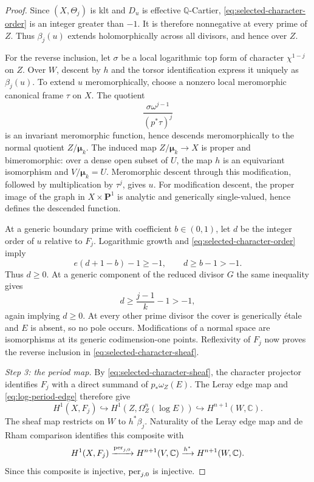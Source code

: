 \documentclass[11pt,a4paper]{article}
\numberwithin{equation}{section}
\theoremstyle{definition}
\theoremstyle{remark}
\newcommand{\Q}{\mathbb Q}\newcommand{\R}{\mathbb R}
\newcommand{\C}{\mathbb C}\newcommand{\Z}{\mathbb Z}
\newcommand{\PP}{\mathbf P}\newcommand{\HH}{\mathbb H}
\begin{document}
\begin{proof}
Since $(X,\Theta_j)$ is klt and $D_u$ is effective $\Q$-Cartier,
\eqref{eq:selected-character-order} is an integer greater than $-1$.
It is therefore nonnegative at every prime of $Z$. Thus $\beta_j(u)$
extends holomorphically across all divisors, and hence over $Z$.

For the reverse inclusion, let $\sigma$ be a local logarithmic top
form of character $\chi^{1-j}$ on $Z$. Over $W$, descent by $h$ and
the torsor identification express it uniquely as $\beta_j(u)$.
To extend $u$ meromorphically, choose a nonzero local meromorphic
canonical frame $\tau$ on $X$. The quotient
\begin{equation}\label{eq:meromorphic-character-ratio}
 \frac{\sigma\omega^{j-1}}{(p^*\tau)^j}
\end{equation}
is an invariant meromorphic function, hence descends meromorphically
to the normal quotient $Z/\boldsymbol\mu_k$. The induced map
$Z/\boldsymbol\mu_k\to X$ is proper and bimeromorphic: over a dense
open subset of $U$, the map $h$ is an equivariant isomorphism and
$V/\boldsymbol\mu_k=U$. Meromorphic descent through this modification,
followed by multiplication by $\tau^j$, gives $u$. For modification
descent, the proper image of the graph in $X\times\PP^1$ is analytic
and generically single-valued, hence defines the descended function.

At a generic boundary prime with coefficient $b\in(0,1)$, let $d$
be the integer order of $u$ relative to $F_j$. Logarithmic growth and
\eqref{eq:selected-character-order} imply
\[
 e(d+1-b)-1\ge-1,\qquad d\ge b-1>-1.
\]
Thus $d\ge0$. At a generic component of the reduced divisor $G$ the
same inequality gives
\[
 d\ge\frac{j-1}{k}-1>-1,
\]
again implying $d\ge0$. At every other prime divisor the cover is
generically étale and $E$ is absent, so no pole occurs. Modifications
of a normal space are isomorphisms at its generic codimension-one
points. Reflexivity of $F_j$ now proves the reverse inclusion in
\eqref{eq:selected-character-sheaf}.

\smallskip\noindent\emph{Step 3: the period map.}
By \eqref{eq:selected-character-sheaf}, the character projector
identifies $F_j$ with a direct summand of $p_*\omega_Z(E)$.
The Leray edge map and \eqref{eq:log-period-edge} therefore give
\begin{equation}\label{eq:period-j-modification}
 H^1(X,F_j)\hookrightarrow H^1(Z,\Omega_Z^n(\log E))
 \hookrightarrow H^{n+1}(W,\C).
\end{equation}
The sheaf map restricts on $W$ to $h^*\beta_j$. Naturality of the Leray
edge map and de Rham comparison identifies this composite with
\begin{equation}\label{eq:intrinsic-period-factorization}
 H^1(X,F_j)\xrightarrow{\per_{j,0}}H^{n+1}(V,\C)
 \xrightarrow{h^*}H^{n+1}(W,\C).
\end{equation}
Since this composite is injective, $\operatorname{per}_{j,0}$ is injective.
\end{proof}
\end{document}
